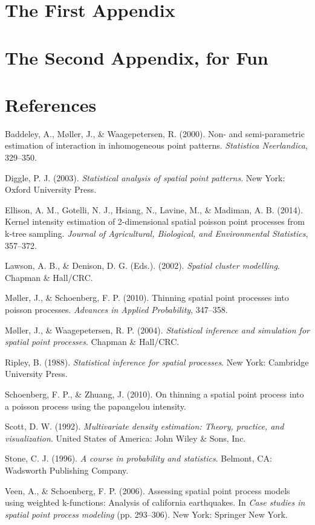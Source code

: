 \documentclass[12pt,twoside]{reedthesis}
\begin{document}
  \appendix
  
  \chapter{The First Appendix}\label{the-first-appendix}
  
  \chapter{The Second Appendix, for
  Fun}\label{the-second-appendix-for-fun}
  
  \backmatter
  
  \chapter{References}\label{references}
  
  \noindent
  
  \setlength{\parindent}{-0.20in} \setlength{\leftskip}{0.20in}
  \setlength{\parskip}{8pt}
  
  Baddeley, A., M{ø}ller, J., \& Waagepetersen, R. (2000). Non- and
  semi-parametric estimation of interaction in inhomogeneous point
  patterns. \emph{Statistica Neerlandica}, 329--350.
  
  Diggle, P. J. (2003). \emph{Statistical analysis of spatial point
  patterns}. New York: Oxford University Press.
  
  Ellison, A. M., Gotelli, N. J., Hsiang, N., Lavine, M., \& Madiman, A.
  B. (2014). Kernel intensity estimation of 2-dimensional spatial poisson
  point processes from k-tree sampling. \emph{Journal of Agricultural,
  Biological, and Environmental Statistics}, 357--372.
  
  Lawson, A. B., \& Denison, D. G. (Eds.). (2002). \emph{Spatial cluster
  modelling}. Chapman \& Hall/CRC.
  
  M{ø}ller, J., \& Schoenberg, F. P. (2010). Thinning spatial point
  processes into poisson processes. \emph{Advances in Applied
  Probability}, 347--358.
  
  M{ø}ller, J., \& Waagepetersen, R. P. (2004). \emph{Statistical
  inference and simulation for spatial point processes}. Chapman \&
  Hall/CRC.
  
  Ripley, B. (1988). \emph{Statistical inference for spatial processes}.
  New York: Cambridge University Press.
  
  Schoenberg, F. P., \& Zhuang, J. (2010). On thinning a spatial point
  process into a poisson process using the papangelou intensity.
  
  Scott, D. W. (1992). \emph{Multivariate density estimation: Theory,
  practice, and visualization}. United States of America: John Wiley \&
  Sons, Inc.
  
  Stone, C. J. (1996). \emph{A course in probability and statistics}.
  Belmont, CA: Wadsworth Publishing Company.
  
  Veen, A., \& Schoenberg, F. P. (2006). Assessing spatial point process
  models using weighted k-functions: Analysis of california earthquakes.
  In \emph{Case studies in spatial point process modeling} (pp. 293--306).
  New York: Springer New York.


\end{document}
